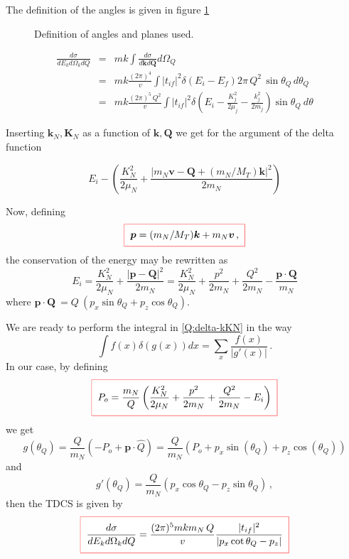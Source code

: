The definition of the angles is given in figure \ref{f:coord}

\begin{figure}[!htb]
    \centering
\caption{Definition of angles and planes used. \label{f:coord}}
\end{figure}

\begin{eqnarray} \label{Q:tdcs1}
\frac{d\sigma}{d E_{k} d\Omega_{k}d Q} &=&  m k \int
\frac{d\sigma}{d \bm{k} d \bm{Q} } d \Omega_{Q} \\
&=& m k \frac{(2 \pi)^{4}}{v}\int | t_{if}|^{2} \delta\left(
E_{i}-E_{f} \right) 2 \pi \, Q^{2} \, \sin \theta_{Q}\, d
\theta_{Q}\nonumber \\
&=& m k \frac{(2 \pi)^{5}\, Q^{2}}{v}\int | t_{if}| ^{2}
\delta\left(E_{i} - \frac{K^{2}_{j}} {2 \mu_{j} } - \frac{k^{2}_{j}}{2
m_{j} }\right) \sin \theta_{Q} \ d \theta \nonumber
\end{eqnarray}

  \noindent
Inserting $\bm{k}_{N}, \bm{K}_{N}$ as a function of $\bm{k}, \bm{Q}$ we
get for the argument of the delta function

\begin{equation}\label{Q:delta-kKN}
E_{i} - \left( \frac{K^{2}_{N}} {2 \mu_{N} } + \frac{\left| m_N \bm{v}
- \bm{Q} + (m_N/M_T) \bm{k} \right| ^{2}}{2 m_N }\right)
\end{equation}

  \noindent
Now, defining
\begin{equation}\label{Q:p-Qk}
\fbeq{ \bm{p} = (m_{N}/M_{T}) \bm{k} + m_{N} \bm{v}\,,}
\end{equation}
%
the conservation of the energy may be rewritten as
%
\begin{equation}\label{Q:Energ-conse-kQ}
E_{i} = \frac{K^{2}_{N}} {2 \mu_{N} } + \frac{| \bm{p} - \bm{Q}
| ^{2}}{2 m_{N}} = \frac{K^{2}_{N}} {2 \mu_{N} } + \frac{p^{2}}{2
m_{N}} + \frac{Q^{2}}{2 m_{N}} - \frac{\bm{p} \cdot \bm{Q}}{m_{N}}
\end{equation}
%
where $\bm{p} \cdot \bm{Q} \ =  Q \ \left(  p_x \sin{\theta_{Q} + p_{z}
\cos \theta_{Q} } \right)$.

We are ready to perform the integral in \ref{Q:delta-kKN} in the way
\[
\int f(x) \delta (g(x)) d x = \sum_{x} \frac{f(x)}{|
g'(x)| } \,.
\]
%
In our case, by defining
%
\[
  \fbeq{
 P_o = \frac{m_{N}}{Q} \left( \frac{K^{2}_{N}} {2 \mu_{N} }+
\frac{p^{2}}{2 m_{N}} + \frac{Q^{2}}{2 m_{N}} - E_{i} \right)
  }
\]
%
 we get
\[
g(\theta_Q) = \frac{Q}{m_{N}}(-P_{o} + \bm{p} \cdot \hat{Q}) =
\frac{Q}{m_{N}}(P_{o} + p_{x} \sin{(\theta_{Q})} + p_{z}
\cos{(\theta_{Q})})
\]
%
and
%
\[
g'(\theta_{Q}) = \frac{Q}{m_N} \left( p_{x} \cos \theta_{Q}  - p_{z}
\sin \theta_Q \right) \, ,
\] 
%
then the TDCS is given by
\begin{equation}\label{Q:5xsEkWkQ}
\fbeq{ \frac{d\sigma}{d E_{k} d\Omega_{k}d Q} =   \frac{(2
\pi)^{5} m k m_N\, Q}{v } \frac{ | t_{if}| ^{2}}{| p_{x}
\cot{\theta_Q} - p_{z} | }}
\end{equation}

